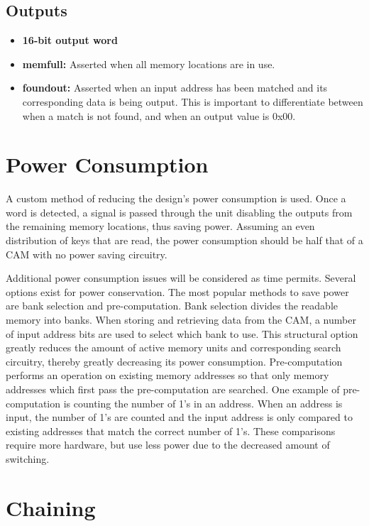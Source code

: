 \documentclass{article}
\begin{document}
  \subsection*{Outputs}
  \begin{itemize}
    \item \textbf{16-bit output word}
    \item \textbf{memfull:}
      Asserted when all memory locations are in use.
    \item \textbf{foundout:}
      Asserted when an input address has been matched and its corresponding
      data is being output. This is important to differentiate between when
      a match is not found, and when an output value is 0x00.
  \end{itemize}

  \section{Power Consumption}

  A custom method of reducing the design's power consumption is used.  Once a
  word is detected, a signal is passed through the unit disabling the outputs
  from the remaining memory locations, thus saving power.  Assuming an even
  distribution of keys that are read, the power consumption should be half that
  of a CAM with no power saving circuitry.

  Additional power consumption issues will be considered as time permits.
  Several options exist for power conservation.  The most popular methods to
  save power are bank selection and pre-computation.  Bank selection divides
  the readable memory into banks.  When storing and retrieving data from the
  CAM, a number of input address bits are used to select which bank to use.
  This structural option greatly reduces the amount of active memory units
  and corresponding search circuitry, thereby greatly decreasing its power
  consumption.  Pre-computation performs an operation on existing memory
  addresses so that only memory addresses which first pass the pre-computation
  are searched.  One example of pre-computation is counting the number of 1's
  in an address.  When an address is input, the number of 1's are counted and
  the input address is only compared to existing addresses that match the
  correct number of 1's.  These comparisons require more hardware, but use
  less power due to the decreased amount of switching.

  \section{Chaining}
\end{document}
